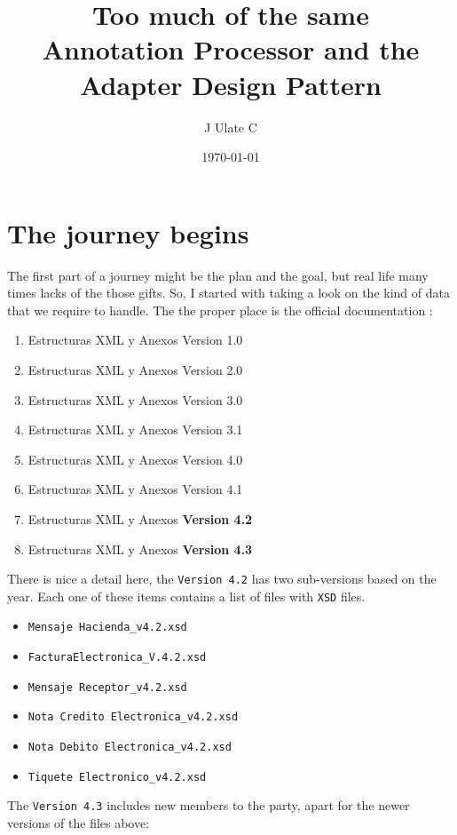 \documentclass{article}
\title{Too much of the same \\
{\small Annotation Processor and the Adapter Design Pattern}}
\author{J Ulate C}
\date{\today}
\begin{document}
\maketitle

\section{The journey begins}

The first part of a journey might be the plan and the goal, but real life many times lacks of the those gifts. So, I started with taking a look on the kind of data that we require to handle.
The the proper place is the official documentation \cite{MinisteriodeHacienda2020PortalEstructuras}:

\begin{enumerate}
\item Estructuras XML y Anexos Version 1.0
\item Estructuras XML y Anexos Version 2.0
\item Estructuras XML y Anexos Version 3.0
\item Estructuras XML y Anexos Version 3.1
\item Estructuras XML y Anexos Version 4.0
\item Estructuras XML y Anexos Version 4.1
\item Estructuras XML y Anexos \textbf{Version 4.2}
\item Estructuras XML y Anexos \textbf{Version 4.3}
\end{enumerate}

There is nice a detail here, the \texttt{Version 4.2} has two sub-versions based on the year. Each one of these items contains a list of files with \texttt{XSD} files. 

\begin{itemize}
\item \texttt{Mensaje Hacienda\_v4.2.xsd}
\item \texttt{FacturaElectronica\_V.4.2.xsd}
\item \texttt{Mensaje Receptor\_v4.2.xsd}
\item \texttt{Nota Credito Electronica\_v4.2.xsd}
\item \texttt{Nota Debito Electronica\_v4.2.xsd}
\item \texttt{Tiquete Electronico\_v4.2.xsd}
\end{itemize}

The \texttt{Version 4.3} includes new members to the party, apart for the newer versions of the files above:
\end{document}
